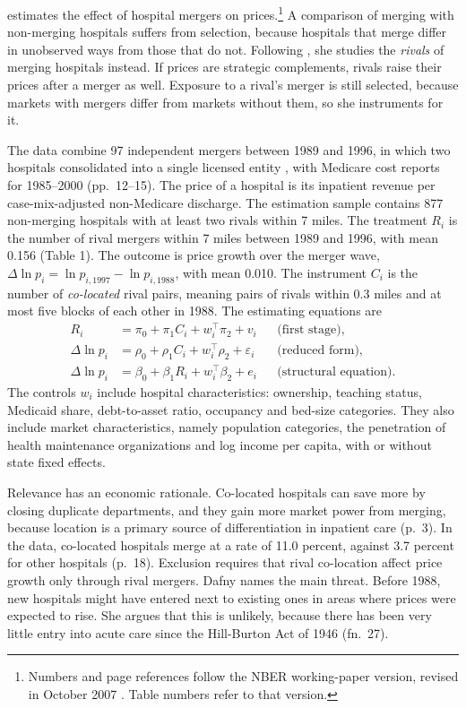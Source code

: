 \citet{Dafny2009} estimates the effect of hospital mergers on prices.\footnote{Numbers and page references
follow the NBER working-paper version, revised in October 2007 \citep{Dafny2005}. Table numbers refer to that
version.} A comparison of merging with non-merging hospitals suffers from selection, because hospitals that
merge differ in unobserved ways from those that do not. Following \citet{Eckbo1983}, she studies the
\emph{rivals} of merging hospitals instead. If prices are strategic complements, rivals raise their prices
after a merger as well. Exposure to a rival's merger is still selected, because markets with mergers differ
from markets without them, so she instruments for it.

The data combine 97 independent mergers between 1989 and 1996, in which two hospitals consolidated into a
single licensed entity \citep{DranoveLindrooth2003}, with Medicare cost reports for 1985--2000 (pp.~12--15).
The price of a hospital is its inpatient revenue per case-mix-adjusted non-Medicare discharge. The estimation
sample contains 877 non-merging hospitals with at least two rivals within 7 miles. The treatment $R_i$ is the
number of rival mergers within 7 miles between 1989 and 1996, with mean 0.156 (Table 1). The outcome is price
growth over the merger wave, $\Delta\ln p_i = \ln p_{i,1997} - \ln p_{i,1988}$, with mean 0.010. The instrument
$C_i$ is the number of \emph{co-located} rival pairs, meaning pairs of rivals within 0.3 miles and at most five
blocks of each other in 1988. The estimating equations are
\begin{align}
R_i &= \pi_0 + \pi_1C_i + w_i^\top\pi_2 + v_i && \text{(first stage)}, \label{eq:A-dafny-fs}\\
\Delta\ln p_i &= \rho_0 + \rho_1C_i + w_i^\top\rho_2 + \varepsilon_i && \text{(reduced form)}, \label{eq:A-dafny-rf}\\
\Delta\ln p_i &= \beta_0 + \beta_1R_i + w_i^\top\beta_2 + e_i && \text{(structural equation)}. \label{eq:A-dafny-iv}
\end{align}
The controls $w_i$ include hospital characteristics: ownership, teaching status, Medicaid share,
debt-to-asset ratio, occupancy and bed-size categories. They also include market characteristics, namely
population categories, the penetration of health maintenance organizations and log income per capita, with or
without state fixed effects.

Relevance has an economic rationale. Co-located hospitals can save more by closing duplicate departments,
and they gain more market power from merging, because location is a primary source of differentiation in
inpatient care (p.~3). In the data, co-located hospitals merge at a rate of 11.0 percent, against 3.7 percent
for other hospitals (p.~18). Exclusion requires that rival co-location affect price growth only through rival
mergers. Dafny names the main threat. Before 1988, new hospitals might have entered next to existing ones in
areas where prices were expected to rise. She argues that this is unlikely, because there has been very
little entry into acute care since the Hill-Burton Act of 1946 (fn.~27).

